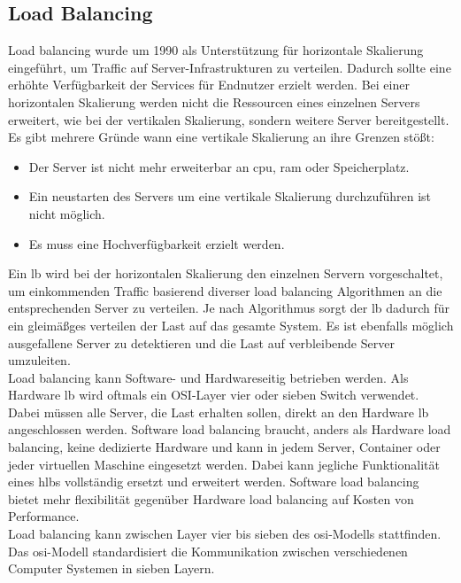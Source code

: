 \subsection{Load Balancing} \label{s:load-balancing}
Load balancing wurde um 1990 als Unterstützung für horizontale Skalierung eingeführt, um Traffic auf Server-Infrastrukturen zu verteilen. Dadurch sollte eine erhöhte Verfügbarkeit der Services für Endnutzer erzielt werden.
\cite{LoadBalancing101}
Bei einer horizontalen Skalierung werden nicht die Ressourcen eines einzelnen Servers erweitert, wie bei der vertikalen Skalierung, sondern weitere Server bereitgestellt. Es gibt mehrere Gründe wann eine vertikale Skalierung an ihre Grenzen stö{\ss}t:
\begin{itemize}
    \item Der Server ist nicht mehr erweiterbar an \acs{cpu}, \acs{ram} oder Speicherplatz.
    \item Ein neustarten des Servers um eine vertikale Skalierung durchzuführen ist nicht möglich.
    \item Es muss eine Hochverfügbarkeit erzielt werden.
\end{itemize}
\cite{bourkeServerLoadBalancing2001}
Ein \acl{lb} wird bei der horizontalen Skalierung den einzelnen Servern vorgeschaltet, um einkommenden Traffic basierend diverser load balancing Algorithmen an die entsprechenden Server zu verteilen.
Je nach Algorithmus sorgt der \ac{lb} dadurch für ein gleimä{\ss}ges verteilen der Last auf das gesamte System. Es ist ebenfalls möglich ausgefallene Server zu detektieren und die Last auf verbleibende Server umzuleiten.
\\
Load balancing kann Software- und Hardwareseitig betrieben werden. Als Hardware \ac{lb} wird oftmals ein OSI-Layer vier oder sieben Switch verwendet. Dabei müssen alle Server, die Last erhalten sollen, direkt an den Hardware \ac{lb} angeschlossen werden.
\cite{WasIstLoad2016}
Software load balancing braucht, anders als Hardware load balancing, keine dedizierte Hardware und kann in jedem Server, Container oder jeder virtuellen Maschine eingesetzt werden.
\cite{SoftwareLoadBalancing}
Dabei kann jegliche Funktionalität eines \acp{hlb} vollständig ersetzt und erweitert werden. Software load balancing bietet mehr flexibilität gegenüber Hardware load balancing auf Kosten von Performance.
\cite{WhatLoadBalancer}
\\
Load balancing kann zwischen Layer vier bis sieben des \ac{osi}-Modells stattfinden.
\cite{WhatLoadBalancer}
Das \ac{osi}-Modell standardisiert die Kommunikation zwischen verschiedenen Computer Systemen in sieben Layern.
